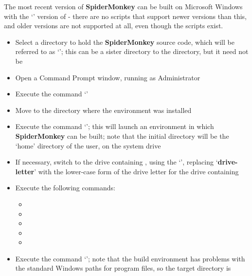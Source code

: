 \tertiaryEnd{}
The most recent version of \textbf{SpiderMonkey} can be built on Microsoft Windows with
the `' version of  - there are
no scripts that support newer versions than this, and older versions are not supported at
all, even though the scripts exist.
\begin{itemize}
\item Select a directory to hold the \textbf{SpiderMonkey} source code, which will be
referred to as `'; this can be a sister directory to the
 directory, but it need not be
\item\exSp{} Open a Command Prompt window, running as Administrator
\item\exSp{} Execute the command
`'
\item\exSp{} Move to the directory where the  environment was
installed
\item\exSp{} Execute the command `'; this will launch
an environment in which \textbf{SpiderMonkey} can be built; note that the initial
directory will be the `home' directory of the user, on the system drive
\item\exSp{} If necessary, switch to the drive containing ,
using the `', replacing `\textbf{drive-letter}' with
the lower-case form of the drive letter for the drive containing
\item\exSp{} Execute the following commands:
\begin{itemize}
\item{}
\item\exSp{}
\item\exSp{}
\item\exSp{}
\item\exSp{}
\end{itemize}
\item\exSp{} Execute the command `'; note that the build environment
has problems with the standard Windows paths for program files, so the target directory is

\end{itemize}
